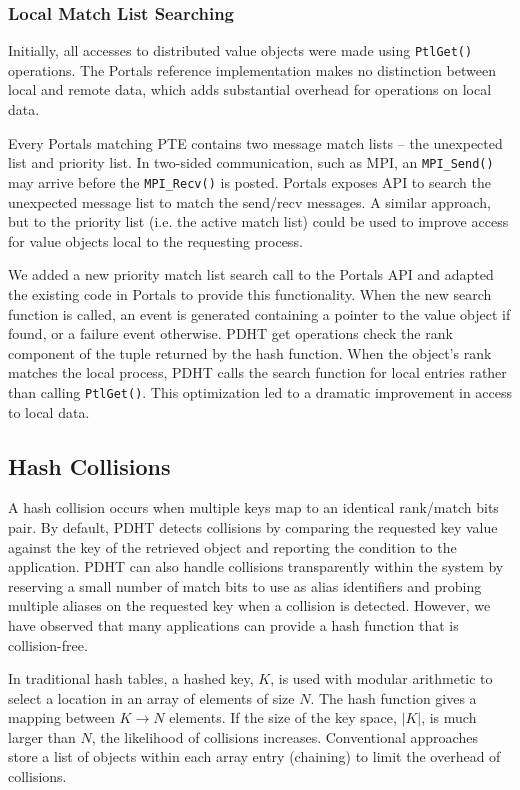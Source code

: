 \subsubsection{Local Match List Searching}

Initially, all accesses to
distributed value objects were made using {\tt PtlGet()} operations. The
Portals reference implementation makes no distinction between local and remote
data, which adds substantial overhead for operations on local data.  

Every Portals matching PTE contains two message match lists -- the unexpected
list and priority list. In two-sided communication, such as MPI, an 
{\tt MPI\_Send()} may arrive before the {\tt MPI\_Recv()} is posted. Portals
exposes API to search the unexpected message list to match the send/recv 
messages. A similar approach, but to the priority list (i.e. the active match
list) could be used to improve access for value objects local to the requesting
process.

We added a new priority match list search call to the Portals API and adapted
the existing code in Portals to provide this functionality. When the new search
function is called, an event is generated containing a pointer to the value
object if found, or a failure event otherwise. PDHT get operations check the
rank component of the tuple returned by the hash function. When the object's
rank matches the local process, PDHT calls the search function for local
entries rather than calling {\tt PtlGet()}. This optimization led to a dramatic
improvement in access to local data.

\subsection{Hash Collisions} 

A hash collision occurs when multiple keys map to an identical rank/match bits
pair. By default, PDHT detects collisions by comparing the requested key value
against the key of the retrieved object and reporting the condition to the
application. PDHT can also handle collisions transparently within the system by reserving
a small number of match bits to use as alias identifiers and probing multiple
aliases on the requested key when a collision is detected. However, we have
observed that many applications can provide a hash function that is
collision-free.

In traditional hash tables, a hashed key, $K$, is used with modular arithmetic
to select a location in an array of elements of size $N$. The hash function
gives a mapping between $K \rightarrow N$ elements.  If the size of the key
space, $|K|$, is much larger than $N$, the likelihood of collisions increases.
Conventional approaches store a list of objects within each array entry
(chaining) to limit the overhead of collisions.

